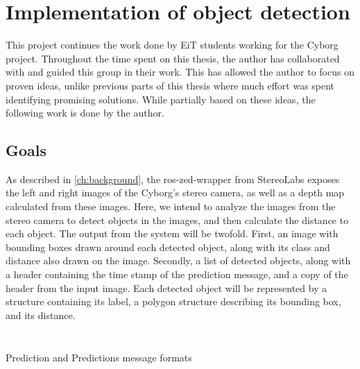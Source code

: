 \documentclass[\rootfolder/main.tex]{subfiles}
\begin{document}
\chapter{Implementation of object detection} %

\label{ch:implementation-objdet} %

This project continues the work done by EiT students working for the Cyborg project.
Throughout the time spent on this thesis, the author has collaborated with and guided this group in their work.
This has allowed the author to focus on proven ideas, unlike previous parts of this thesis where much effort was spent identifying promising solutions.
While partially based on these ideas, the following work is done by the author.


\section{Goals}

As described in \cref{ch:background}, the ros-zed-wrapper from StereoLabs exposes the left and right images of the Cyborg's stereo camera, as well as a depth map calculated from these images.
Here, we intend to analyze the images from the stereo camera to detect objects in the images, and then calculate the distance to each object.
The output from the system will be twofold.
First, an image with bounding boxes drawn around each detected object, along with its class and distance also drawn on the image.
Secondly, a list of detected objects, along with a header containing the time stamp of the prediction message, and a copy of the header from the input image.
Each detected object will be represented by a structure containing its label, a polygon structure describing its bounding box, and its distance.

\begin{listing}
    \inputminted{python}{\rootfolder/Chapters/Chapter5/Listings/Prediction.msg}
    \inputminted{python}{\rootfolder/Chapters/Chapter5/Listings/Predictions.msg}
    \caption{Prediction and Predictions message formats\label{lst:prediction-msg}}
\end{listing}
\end{document}
